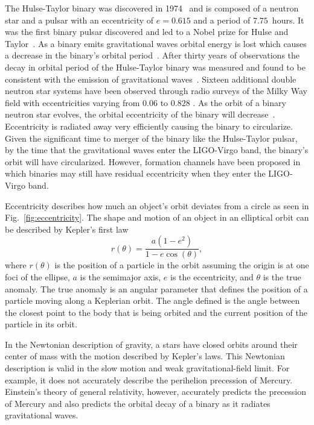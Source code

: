 The Hulse-Taylor binary was discovered in 1974~\cite{Hulse:1974eb} and is composed of a neutron star and a pulsar with an eccentricity of $e=0.615$ and a period of $7.75$~hours. It was the first binary pulsar discovered and led to a Nobel prize for Hulse and Taylor~\cite{Buehrke:1993nd}. As a binary emits gravitational waves orbital energy is lost which causes a decrease in the binary's orbital period~\cite{Peters:1963ux, Peters:1964zz}. After thirty years of observations the decay in orbital period of the Hulse-Taylor binary was measured and found to be consistent with the emission of gravitational waves~\cite{Weisberg:2004hi}. Sixteen additional double neutron star systems have been observed through radio surveys of the Milky Way field \cite{Martinez:2017jbp,Tauris:2017omb,Cameron:2017ody,Stovall:2018ouw,Lynch:2018zxo} with eccentricities varying from $0.06$ to $0.828$ \cite{Zhu:2017znf,Andrews:2019vou}. As the orbit of a binary neutron star evolves, the orbital eccentricity of the binary will decrease~\cite{Peters:1964zz}. Eccentricity is radiated away very efficiently causing the binary to circularize. Given the significant time to merger of the binary like the Hulse-Taylor pulsar, by the time that the gravitational waves enter the LIGO-Virgo band, the binary's orbit will have circularized. However, formation channels have been proposed in which binaries may still have residual eccentricity when they enter the LIGO-Virgo band.

Eccentricity describes how much an object's orbit deviates from a circle as seen in Fig.~\ref{fig:eccentricity}. The shape and motion of an object in an elliptical orbit can be described by Kepler's first law
\begin{equation}
    r(\theta) = \frac{a(1-e^2)}{1-e\cos(\theta)},
\end{equation}
where $r(\theta)$ is the position of a particle in the orbit assuming the origin is at one foci of the ellipse, $a$ is the semimajor axis, $e$ is the eccentricity, and $\theta$ is the true anomaly. The true anomaly is an angular parameter that defines the position of a particle moving along a Keplerian orbit. The angle defined is the angle between the closest point to the body that is being orbited and the current position of the particle in its orbit. 

In the Newtonian description of gravity, a stars have closed orbits around their center of mass with the motion described by Kepler's laws. This Newtonian description is valid in the slow motion and weak gravitational-field limit. For example, it does not accurately describe the perihelion precession of Mercury. Einstein's theory of general relativity, however, accurately predicts the precession of Mercury and also predicts the orbital decay of a binary as it radiates gravitational waves.

